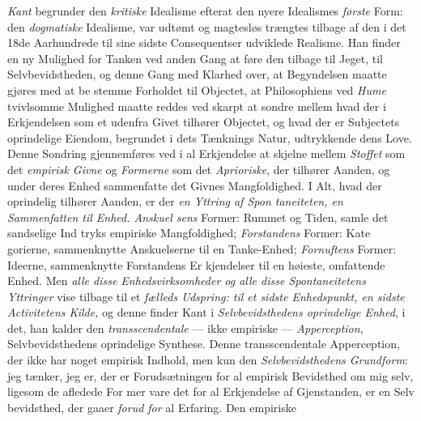 \emph{Kant} begrunder den \emph{kritiske} Idealisme efterat den
nyere Idealismes \emph{første} Form: den \emph{dogmatiske} Idealisme,
var udtømt og magtesløs trængtes tilbage af den i det 18de
Aarhundrede til sine sidste Consequentser udviklede Realisme.
Han finder en ny Mulighed for Tanken ved anden Gang at
føre den tilbage til Jeget, til Selvbevidstheden, og denne Gang
med Klarhed over, at Begyndelsen maatte gjøres med at be\-%
stemme Forholdet til Objectet, at Philosophiens ved \emph{Hume}
tvivlsomme Mulighed maatte reddes ved skarpt at sondre
mellem hvad der i Erkjendelsen som et udenfra Givet tilhører
Objectet, og hvad der er Subjectets oprindelige Eiendom,
begrundet i dets Tænknings Natur, udtrykkende dens Love.
Denne Sondring gjennemføres ved i al Erkjendelse at skjelne
mellem \emph{Stoffet} som det \emph{empirisk Givne} og \emph{Formerne}
som det \emph{Aprioriske}, der tilhører Aanden, og under deres
Enhed sammenfatte det Givnes Mangfoldighed. I Alt, hvad
der oprindelig tilhører Aanden, er der \emph{en Yttring af Spon\-%
taneiteten, en Sammenfatten til Enhed. Anskuel\-%
sens} Former: Rummet og Tiden, samle det sandselige Ind\-%
tryks empiriske Mangfoldighed; \emph{Forstandens} Former: Kate\-%
gorierne, sammenknytte Anskuelserne til en Tanke-Enhed;
\emph{Fornuftens} Former: Ideerne, sammenknytte Forstandens Er\-%
kjendelser til en høieste, omfattende Enhed. Men \emph{alle disse
Enhedsvirksomheder og alle disse Spontaneitetens
 Yttringer} vise tilbage til et \emph{fælleds Udspring: til et
sidste Enhedspunkt, en sidste Activitetens Kilde,}
og denne finder Kant i \emph{Selvbevidsthedens oprindelige
Enhed}, i det, han kalder den \emph{transscendentale} --- ikke\-%
empiriske --- \emph{Apperception}, Selvbevidsthedens oprindelige
Synthese. Denne transscendentale Apperception, der ikke har
noget empirisk Indhold, men kun den \emph{Selvbevidsthedens
Grundform}: jeg tænker, jeg er, der er Forudsætningen for
al empirisk Bevidsthed om mig selv, ligesom de afledede For\-%
mer vare det for al Erkjendelse af Gjenstanden, er en Selv\-%
bevidsthed, der gaaer \emph{forud for} al Erfaring. Den empiriske
